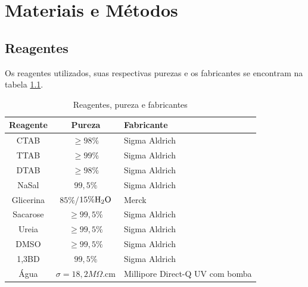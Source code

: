 \part{Materiais e Métodos}
	\chapter{Reagentes}
	
	Os reagentes utilizados, suas respectivas purezas e os fabricantes se encontram na tabela \ref{tab:reagentes}.
	
	\begin{table}[H]
		\IBGEtab%
		{\caption{Reagentes, pureza e fabricantes}
		\label{tab:reagentes}}%
	    {
		\centering
		\begin{tabular}{c c p{3.2cm}}
			\toprule
			Reagente  & Pureza                                          & Fabricante                                                  \\ \midrule
			  CTAB    & \(\geqslant 98\%\)                              & Sigma Aldrich                                               \\
			  TTAB    & \(\geqslant 99\%\)                              & Sigma Aldrich                                               \\
			  DTAB    & \(\geqslant 98\%\)                              & Sigma Aldrich                                               \\
			  NaSal   & \(99{,}5\%\)                                    & Sigma Aldrich                                               \\
			Glicerina & \(85\%\)/\(15\%\textnormal{H}_2\textnormal{O}\) & Merck                                                       \\
			Sacarose  & \(\geqslant 99{,}5\%\)                          & Sigma Aldrich                                               \\
			  Ureia   & \(\geqslant 99{,}5\%\)                          & Sigma Aldrich                                               \\
			  DMSO    & \(\geqslant 99{,}5\%\)                          & Sigma Aldrich                                               \\
			  1,3BD   & \(99{,}5\%\)                                    & Sigma Aldrich                                               \\
			  Água    & \(\sigma = 18{,}2M\Omega\).cm                   & Millipore Direct-Q\textregistered{} \newline 3 UV com bomba \\ \bottomrule
		\end{tabular}}%
		{}
	\end{table}
	
